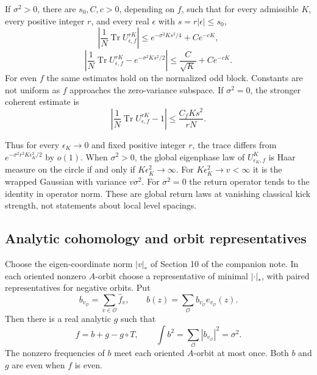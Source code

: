 \begin{theorem}\label{pass1:return_phase-1} If \(\sigma^2>0\), there are \(s_0,C,c>0\), depending on
\(f\), such that for every admissible \(K\), every positive integer \(r\),
and every real \(\epsilon\) with \(s=r|\epsilon|\le s_0\),
\[
 \left|\frac1N\operatorname{Tr}U_{\epsilon,f}^{rK}\right|
                 \le e^{-\sigma^2Ks^2/4}+Ce^{-cK},          \tag{Ret.R1}
\]
\[
 \left|\frac1N\operatorname{Tr}U_{\epsilon,f}^{rK}
                          -e^{-\sigma^2Ks^2/2}\right|
                 \le\frac C{\sqrt K}+Ce^{-cK}.             \tag{Ret.R2}
\]
For even \(f\) the same estimates hold on the normalized odd block.
Constants are not uniform as \(f\) approaches the zero-variance subspace.
If \(\sigma^2=0\), the stronger coherent estimate is
\[
 \left|\frac1N\operatorname{Tr}U_{\epsilon,f}^{rK}-1\right|
                         \le \frac{C_fKs^2}{rN}.            \tag{Ret.R3}
\]
\end{theorem}

Thus for every \(\epsilon_K\to0\) and fixed positive integer \(r\),
the trace differs from \(e^{-\sigma^2r^2K\epsilon_K^2/2}\) by \(o(1)\).
When \(\sigma^2>0\), the global eigenphase law of \(U_{\epsilon_K,f}^K\)
is Haar measure on the circle if and only if \(K\epsilon_K^2\to\infty\).
For \(K\epsilon_K^2\to v<\infty\) it is the wrapped Gaussian with variance
\(v\sigma^2\). For \(\sigma^2=0\) the return operator tends to the identity
in operator norm. These are global return laws at vanishing classical
kick strength, not statements about local level spacings.

\hypertarget{analytic-cohomology-and-orbit-representatives}{%
\subsection{Analytic cohomology and orbit representatives}\label{analytic-cohomology-and-orbit-representatives}}

Choose the eigen-coordinate norm \(|v|_*\) of Section 10 of the companion
note. In each oriented nonzero \(A\)-orbit choose a representative of
minimal \(|\cdot|_*\), with paired representatives for negative orbits.
Put
\[
 b_{v_{\mathcal O}}=\sum_{v\in\mathcal O}\widehat f_v,\qquad
 b(z)=\sum_{\mathcal O}b_{v_{\mathcal O}}e_{v_{\mathcal O}}(z).
\]
Then there is a real analytic \(g\) such that
\[
 f=b+g-g\circ T,\qquad
 \int b^2=\sum_{\mathcal O}|b_{v_{\mathcal O}}|^2=\sigma^2.  \tag{Ret.R4}
\]
The nonzero frequencies of \(b\) meet each oriented \(A\)-orbit at most once.
Both \(b\) and \(g\) are even when \(f\) is even.

